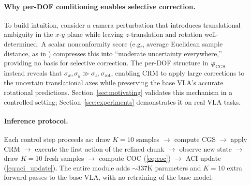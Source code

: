 \paragraph{Why per-DOF conditioning enables selective correction.}
To build intuition, consider a camera perturbation that introduces translational ambiguity in the $x$-$y$ plane while leaving $z$-translation and rotation well-determined.  A scalar nonconformity score (e.g., average Euclidean sample distance, as in \cite{chen2026reconvla}) compresses this into ``moderate uncertainty everywhere,'' providing no basis for selective correction.  The per-DOF structure in $\boldsymbol{\varphi}_{\mathrm{CGS}}$ instead reveals that $\sigma_{x},\sigma_{y} \gg \sigma_{z},\sigma_{\mathrm{rot}}$, enabling CRM to apply large corrections to the uncertain translational axes while preserving the base VLA's accurate rotational predictions.  Section~\ref{sec:motivating} validates this mechanism in a controlled setting; Section~\ref{sec:experiments} demonstrates it on real VLA tasks.

\paragraph{Inference protocol.}
Each control step proceeds as: draw $K{=}10$ samples $\to$ compute CGS $\to$ apply CRM $\to$ execute the first action of the refined chunk $\to$ observe new state $\to$ draw $K{=}10$ fresh samples $\to$ compute COC (\ref{eq:coc}) $\to$ ACI update (\ref{eq:aci_update}).  The entire module adds ${\sim}$337K parameters and $K{=}10$ extra forward passes to the base VLA, with no retraining of the base model.
